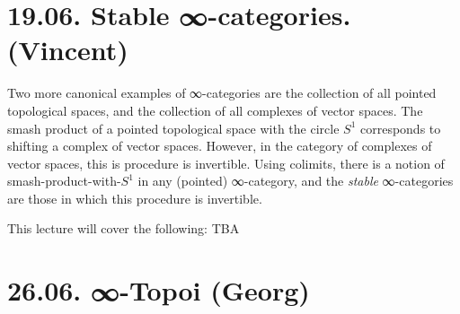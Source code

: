 \documentclass[a4paper]{amsart}
\numberwithin{figure}{section}
\theoremstyle{theorem}
\theoremstyle{definition}
\begin{document}

\section{19.06. Stable ∞-categories. (Vincent)}

Two more canonical examples of ∞-categories are the collection of all pointed topological spaces, and the collection of all complexes of vector spaces. The smash product of a pointed topological space with the circle $S^1$ corresponds to shifting a complex of vector spaces. %
However, in the category of complexes of vector spaces, this is procedure is invertible. Using colimits, there is a notion of smash-product-with-$S^1$ in any (pointed) ∞-category, and the \emph{stable} ∞-categories are those in which this procedure is invertible.

This lecture will cover the following: TBA

%
%
%

\section{26.06. ∞-Topoi (Georg)}
\end{document}
